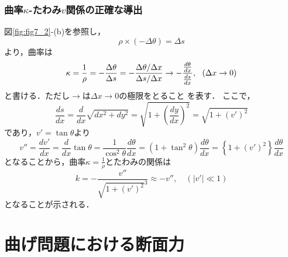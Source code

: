 \documentclass[10pt,a4j]{jbook}
\begin{document}
\subsubsection*{曲率$\kappa$-たわみ$v$関係の正確な導出}
図\ref{fig:fig7_2}-(b)を参照し，
\begin{equation}
	\rho  \times \left( { - \Delta \theta } \right) = \Delta s
\end{equation}
より，曲率は
\begin{equation}
	\kappa  = \frac{1}{\rho } =  - \frac{{\Delta \theta }}{{\Delta s}} =  - \frac{{{{\Delta \theta } \mathord{\left/
 {\vphantom {{\Delta \theta } {\Delta x}}} \right.
 \kern-\nulldelimiterspace} {\Delta x}}}}{{{{\Delta s} \mathord{\left/
 {\vphantom {{\Delta s} {\Delta x}}} \right.
 \kern-\nulldelimiterspace} {\Delta x}}}} \to  - \frac{{\frac{{d\theta }}{{dx}}}}{{\frac{{ds}}{{dx}}}}
	, \ \ \left(\Delta x \rightarrow 0\right)
\end{equation}
と書ける．ただし$\rightarrow$は$\Delta x \rightarrow 0$の極限をとること
を表す．
ここで，
\begin{equation}
	\frac{{ds}}{{dx}} = \frac{d}{{dx}}\sqrt {d{x^2} + d{y^2}}  = \sqrt {1 + {{\left( {\frac{{dy}}{{dx}}} \right)}^2}}  = \sqrt {1 + {{\left( {v'} \right)}^2}} 
\end{equation}
であり，$v'=\tan \theta$より
\begin{equation}
	v''=
	\frac{{dv'}}{{dx}} = \frac{d}{{dx}}\tan \theta  = \frac{1}{{{{\cos }^2}\theta }}\frac{{d\theta }}{{dx}} = \left( {1 + {{\tan }^2}\theta } \right)\frac{{d\theta }}{{dx}} = \left\{ {1 + {{\left( {v'} \right)}^2}} \right\}\frac{{d\theta }}{{dx}}
\end{equation}
となることから，曲率$\kappa=\frac{1}{\rho}$とたわみの関係は
\begin{equation}
	k =  - \frac{{v''}}{{{{\sqrt {1 + {{\left( {v'} \right)}^2}} }^3}}} \approx  - v'',\quad \left( {\left| {v'} \right| \ll 1} \right)
\end{equation}
となることが示される．
\section{曲げ問題における断面力}
\end{document}

